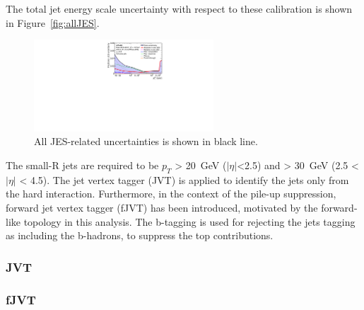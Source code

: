 The total jet energy scale uncertainty with respect to these calibration is shown in Figure~\ref{fig:allJES}.
\begin{figure}[tbp]
    \begin{center}
    \includegraphics[width=0.6\textwidth,keepaspectratio]{figures/Reconstruction/allJES}
    \caption{
    All JES-related uncertainties is shown in black line. \cite{JETM-2018-05}
    }
    \label{fig:in-situcalibration}
    \end{center}
\end{figure}

The small-R jets are required to be $p_T$ > 20~GeV ($|\eta|$<2.5) and > 30~GeV (2.5 < $|\eta|$ < 4.5).
The jet vertex tagger (JVT) is applied to identify the jets only from the hard interaction. Furthermore, in the context of the pile-up suppression, forward jet vertex tagger (fJVT) has been introduced, motivated by the forward-like topology in this analysis.
The b-tagging is used for rejecting the jets tagging as including the b-hadrons, to suppress the top contributions.

\subsubsection{JVT}
\subsubsection{fJVT}

